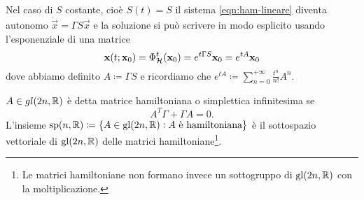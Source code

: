 Nel caso di $ S $ costante, cioè $ S(t) = S $ il sistema \eqref{eqn:ham-lineare} diventa autonomo $ \dot{\vec{x}} = \Gamma S \vec{x} $ e la soluzione si può scrivere in modo esplicito usando l'esponenziale di una matrice
\begin{equation}
    \mathbf{x}(t; \mathbf{x}_0) = \Phi^t_{\mathcal{H}}(\mathbf{x}_0) = e^{t \Gamma S} \mathbf{x}_0 = e^{tA} \mathbf{x}_0
\end{equation}
dove abbiamo definito $ A \coloneqq \Gamma S $ e ricordiamo che $ e^{tA} \coloneqq \sum_{n=0}^{+\infty} \frac{t^n}{n!}A^n $.

\begin{definition}
    $ A \in gl(2n, \mathbb{R}) $ è detta matrice hamiltoniana o simplettica infinitesima se
    \begin{equation}
        A^T \Gamma + \Gamma A = 0.
    \end{equation}
    L'insieme $ \mathrm{sp}(n, \mathbb{R}) \coloneqq \{A \in \mathrm{gl}(2n, \mathbb{R}) : A \text{ è hamiltoniana}\} $ è il sottospazio vettoriale di $ \mathrm{gl}(2n, \mathbb{R}) $ delle matrici hamiltoniane\footnote{Le matrici hamiltoniane non formano invece un sottogruppo di $ \mathrm{gl}(2n, \mathbb{R}) $ con la moltiplicazione.}.
\end{definition}

